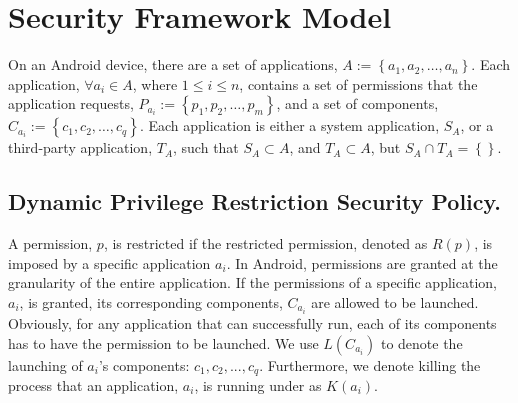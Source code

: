 \section{Security Framework Model}



On an Android device, there are
a set of applications, $A := \left\{a_{1},a_{2},\ldots,a_{n}\right\}$.
Each application, $\forall a_{i} \in A$, where $1 \le i \le n$,
contains a set of permissions that the application requests,
$P_{a_{i}} := \left\{p_{1}, p_{2},\ldots,p_{m}\right\}$,
and a set of components,
$C_{a_{i}} := \left\{c_{1},c_{2},\ldots,c_{q}\right\}$.
Each application is either a system application, $S_{A}$,
or a third-party application, $T_{A}$, such that $S_{A}\subset A$, and $T_{A} \subset A$,
but $S_{A} \cap T_{A} = \left\{\right\}$.

\subsection{Dynamic Privilege Restriction Security Policy.}  

A permission, $p$, is restricted if the restricted permission, denoted
as $R\left(p\right)$, is imposed
by a specific application $a_{i}$.
In Android, permissions are granted at the granularity
of the entire application.  If the permissions of a specific
application, $a_i$, is granted, its corresponding components,
$C_{a_i}$ are allowed to be launched. Obviously, for any application
that can successfully run, each of its components has to have the
permission to be launched. We use $L(C_{a_i})$ to
denote the launching of $a_i$'s components: $c_1, c_2,...,c_q$.
%
Furthermore, we denote killing the process
that an application, $a_{i}$, is running under as $K(a_{i})$.

